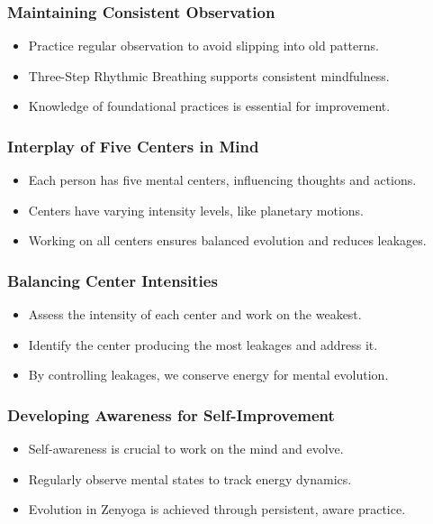\begin{frame}[fragile]\frametitle{Maintaining Consistent Observation}
    \begin{itemize}
        \item Practice regular observation to avoid slipping into old patterns.
        \item Three-Step Rhythmic Breathing supports consistent mindfulness.
        \item Knowledge of foundational practices is essential for improvement.
    \end{itemize}
\end{frame}

\begin{frame}[fragile]\frametitle{Interplay of Five Centers in Mind}
    \begin{itemize}
        \item Each person has five mental centers, influencing thoughts and actions.
        \item Centers have varying intensity levels, like planetary motions.
        \item Working on all centers ensures balanced evolution and reduces leakages.
    \end{itemize}
\end{frame}

\begin{frame}[fragile]\frametitle{Balancing Center Intensities}
    \begin{itemize}
        \item Assess the intensity of each center and work on the weakest.
        \item Identify the center producing the most leakages and address it.
        \item By controlling leakages, we conserve energy for mental evolution.
    \end{itemize}
\end{frame}

\begin{frame}[fragile]\frametitle{Developing Awareness for Self-Improvement}
    \begin{itemize}
        \item Self-awareness is crucial to work on the mind and evolve.
        \item Regularly observe mental states to track energy dynamics.
        \item Evolution in Zenyoga is achieved through persistent, aware practice.
    \end{itemize}
\end{frame}


